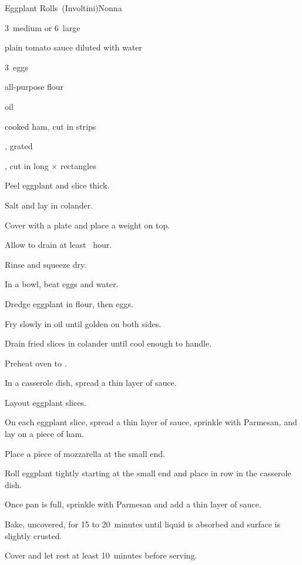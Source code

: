 \begin{recipe}{Eggplant Rolls~(Involtini)}{Nonna}{}

\begin{ingredients}
\item 3~medium  or 6~large 
\item plain tomato sauce diluted with water
\item 3~eggs
\item all-purpose flour
\item oil
\item cooked ham, cut in  strips
\item {}, grated
\item {}, cut in long \inch{\quarter}$\times$\inch{\quarter} rectangles
\end{ingredients}

\begin{directions}
\item Peel eggplant and slice \inch{\quarter} thick.
\item Salt and lay in colander.
\item Cover with a plate and place a weight on top.
\item Allow to drain at least \half{}~hour.
\item Rinse and squeeze dry.
\item In a bowl, beat eggs and \C{\half} water.
\item Dredge eggplant in flour, then eggs.
\item Fry slowly in  oil until golden on both sides.
\item Drain fried slices in colander until cool enough to handle.
\item Preheat oven to .
\item In a casserole dish, spread a thin layer of sauce.
\item Layout eggplant slices.
\item On each eggplant slice, spread a thin layer of sauce, sprinkle with Parmesan, and lay on a piece of ham.
\item Place a piece of mozzarella at the small end.
\item Roll eggplant tightly starting at the small end and place in row in the casserole dish.
\item Once pan is full, sprinkle with Parmesan and add a thin layer of sauce.
\item Bake, uncovered, for 15 to 20~minutes until liquid is absorbed and surface is slightly crusted.
\item Cover and let rest at least 10~minutes before serving.
\end{directions}

\end{recipe}
